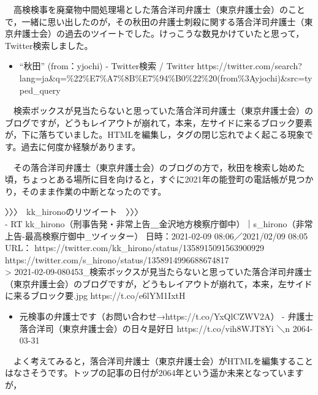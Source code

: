 \documentclass[
]{ltjarticle}
\author{}
\date{}
\providecommand{\tightlist}{%
  \setlength{\itemsep}{0pt}\setlength{\parskip}{0pt}}
\begin{document}
{
\setcounter{tocdepth}{4}
\tableofcontents
}
　高検検事を廃棄物中間処理場とした落合洋司弁護士（東京弁護士会）のことで，一緒に思い出したのが，その秋田の弁護士刺殺に関する落合洋司弁護士（東京弁護士会）の過去のツイートでした。けっこうな数見かけていたと思って，Twitter検索しました。

\begin{itemize}
\tightlist
\item
  ``秋田'' (from：yjochi) - Twitter検索 / Twitter
  https://twitter.com/search?lang=ja\&q=\%22\%E7\%A7\%8B\%E7\%94\%B0\%22\%20(from\%3Ayjochi)\&src=typed\_query
\end{itemize}

　検索ボックスが見当たらないと思っていた落合洋司弁護士（東京弁護士会）のブログですが，どうもレイアウトが崩れて，本来，左サイドに来るブロック要素が，下に落ちていました。HTMLを編集し，タグの閉じ忘れでよく起こる現象です。過去に何度か経験があります。

　その落合洋司弁護士（東京弁護士会）のブログの方で，秋田を検索し始めた頃，ちょっとある場所に目を向けると，すぐに2021年の能登町の電話帳が見つかり，そのまま作業の中断となったのです。

〉〉〉　kk\_hironoのリツイート　〉〉〉\\
- RT
kk\_hirono（刑事告発・非常上告＿金沢地方検察庁御中）｜s\_hirono（非常上告-最高検察庁御中\_ツイッター）
日時：2021-02-09 08:06／2021/02/09 08:05 URL：
https://twitter.com/kk\_hirono/status/1358915091563900929
https://twitter.com/s\_hirono/status/1358914996688674817\\
\textgreater{}
2021-02-09-080453\_検索ボックスが見当たらないと思っていた落合洋司弁護士（東京弁護士会）のブログですが，どうもレイアウトが崩れて，本来，左サイドに来るブロック要.jpg
https://t.co/e6lYM1IxtH

\begin{itemize}
\tightlist
\item
  元検事の弁護士です（お問い合わせ→https://t.co/YxQlCZWV2A） -
  弁護士落合洋司（東京弁護士会）の日々是好日 https://t.co/vih8WJT8Yi ＼n
  2064-03-31
\end{itemize}

　よく考えてみると，落合洋司弁護士（東京弁護士会）がHTMLを編集することはなさそうです。トップの記事の日付が2064年という遥か未来となっていますが，
\end{document}
